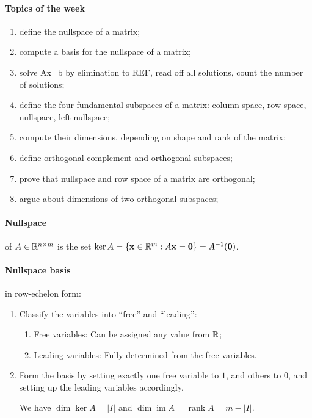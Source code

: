\documentclass{article}
\begin{document}
\paragraph{Topics of the week} 

\begin{enumerate}
    \item define the nullspace of a matrix;
    \item compute a basis for the nullspace of a matrix; 
    \item solve Ax=b by elimination to REF, read off all solutions, count the number of solutions;
    \item define the four fundamental subspaces of a matrix: column space, row space, nullspace, left nullspace; 
    \item compute their dimensions, depending on shape and rank of the matrix;
    \item define orthogonal complement and orthogonal subspaces;
    \item prove that nullspace and row space of a matrix are orthogonal;
    \item argue about dimensions of two orthogonal subspaces;
\end{enumerate}

\paragraph{Nullspace} of $A \in \mathbb{R}^{n \times m}$ is the set $\ker A = \{\mathbf x \in \mathbb{R}^m : A \mathbf x = \mathbf 0\} = A^{-1}(\mathbf 0)$.

\paragraph{Nullspace basis} in row-echelon form:

\begin{enumerate}
    \item Classify the variables into ``free'' and ``leading'':
    \begin{enumerate}
        \item Free variables: Can be assigned any value from $\mathbb{R}$;
        \item Leading variables: Fully determined from the free variables.
    \end{enumerate}
    \item Form the basis by setting exactly one free variable to $1$, and others to $0$, and setting up the leading variables accordingly.
    
    We have $\dim \ker A = |I|$ and $\dim \operatorname{im} A = \operatorname{rank} A = m - |I|$.
\end{enumerate}
\end{document}

